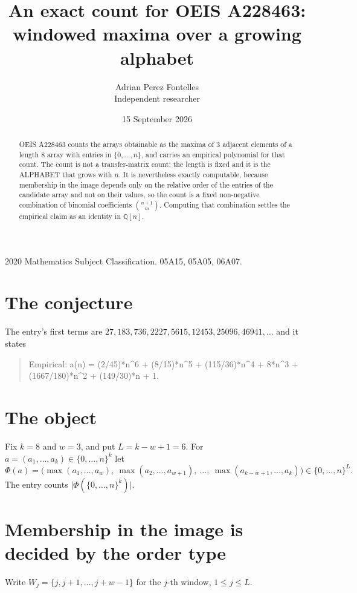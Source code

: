 \documentclass[11pt,a4paper]{article}
\title{An exact count for OEIS A228463: windowed maxima over a growing alphabet}
\author{Adrian Perez Fontelles\\ \small Independent researcher}
\date{15 September 2026}
\theoremstyle{plain}
\theoremstyle{definition}
\begin{document}
\maketitle

\begin{abstract}
OEIS A228463 counts the arrays obtainable as the maxima of $3$ adjacent elements of a length
$8$ array with entries in $\{0,\dots,n\}$, and carries an empirical polynomial for that
count. The count is not a transfer-matrix count: the length is fixed and it is the ALPHABET
that grows with $n$. It is nevertheless exactly computable, because membership in the image
depends only on the relative order of the entries of the candidate array and not on their
values, so the count is a fixed non-negative combination of binomial coefficients
$\binom{n+1}{m}$. Computing that combination settles the empirical claim as an identity in
$\mathbb{Q}[n]$.
\end{abstract}

\noindent\small 2020 Mathematics Subject Classification. 05A15, 05A05, 06A07.\normalsize

\section{The conjecture}

The entry's first terms are $27, 183, 736, 2227, 5615, 12453, 25096, 46941,\dots$ and it states

\begin{quote}\raggedright Empirical: a(n) = (2/45)*n\^{}6 + (8/15)*n\^{}5 + (115/36)*n\^{}4 + 8*n\^{}3 + (1667/180)*n\^{}2 + (149/30)*n + 1.\end{quote}

\section{The object}

Fix $k=8$ and $w=3$, and put $L=k-w+1=6$. For $a=(a_1,\dots,a_k)\in\{0,\dots,n\}^k$
let
\[
  \Phi(a)=\bigl(\max(a_1,\dots,a_w),\ \max(a_2,\dots,a_{w+1}),\ \dots,\
  \max(a_{k-w+1},\dots,a_k)\bigr)\in\{0,\dots,n\}^{L} .
\]
The entry counts $\lvert\Phi(\{0,\dots,n\}^k)\rvert$.

\section{Membership in the image is decided by the order type}

Write $W_j=\{j,j+1,\dots,j+w-1\}$ for the $j$-th window, $1\le j\le L$.
\end{document}
